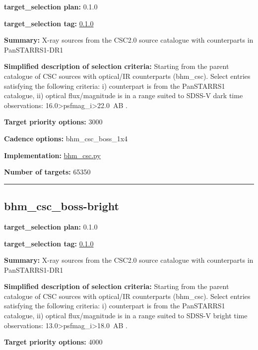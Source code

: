 \noindent\textbf{target\_selection plan:} 0.1.0

\noindent\textbf{target\_selection tag:}
\href{https://github.com/sdss/target_selection/tree/0.1.0/}{0.1.0}

\noindent\textbf{Summary:} X-ray sources from the CSC2.0 source catalogue with
counterparts in PanSTARRS1-DR1

\noindent\textbf{Simplified description of selection criteria:} Starting from the
parent catalogue of CSC sources with optical/IR counterparts (bhm\_csc).
Select entries satisfying the following criteria: i) counterpart is from
the PanSTARRS1 catalogue, ii) optical flux/magnitude is in a range
suited to SDSS-V dark time observations:
16.0\textgreater psfmag\_i\textgreater22.0~AB .


\noindent\textbf{Target priority options:} 3000

\noindent\textbf{Cadence options:} bhm\_csc\_boss\_1x4

\noindent\textbf{Implementation:}
\href{https://github.com/sdss/target_selection/blob/0.1.0/python/target_selection/cartons/bhm_csc.py}{bhm\_csc.py}

\noindent\textbf{Number of targets:} 65350

\begin{center}\rule{0.5\linewidth}{0.5pt}\end{center}

\hypertarget{bhm_csc_boss-bright_plan0.1.0}{%
\subsection{bhm\_csc\_boss-bright}\label{bhm_csc_boss-bright_plan0.1.0}}

\noindent\textbf{target\_selection plan:} 0.1.0

\noindent\textbf{target\_selection tag:}
\href{https://github.com/sdss/target_selection/tree/0.1.0/}{0.1.0}

\noindent\textbf{Summary:} X-ray sources from the CSC2.0 source catalogue with
counterparts in PanSTARRS1-DR1

\noindent\textbf{Simplified description of selection criteria:} Starting from the
parent catalogue of CSC sources with optical/IR counterparts (bhm\_csc).
Select entries satisfying the following criteria: i) counterpart is from
the PanSTARRS1 catalogue, ii) optical flux/magnitude is in a range
suited to SDSS-V bright time observations:
13.0\textgreater psfmag\_i\textgreater18.0~AB .


\noindent\textbf{Target priority options:} 4000

